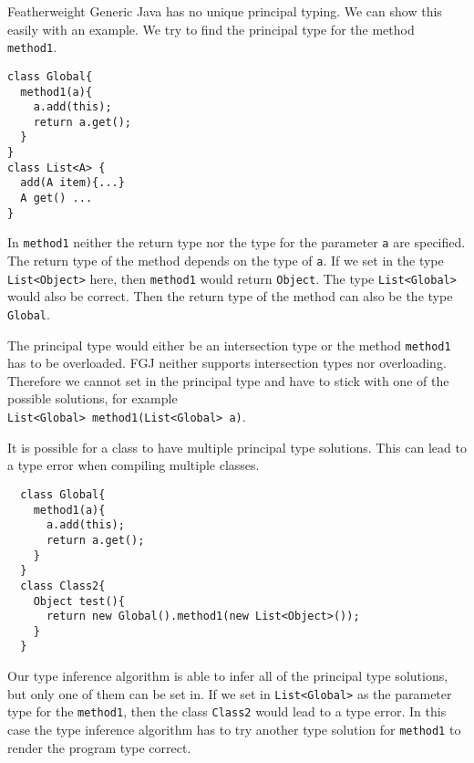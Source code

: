 Featherweight Generic Java has no unique principal typing.
We can show this easily with an example.
We try to find the principal type for the method \texttt{method1}.
\begin{lstlisting}
class Global{
  method1(a){
    a.add(this);
    return a.get();
  }
}
class List<A> {
  add(A item){...}
  A get() ...
}
\end{lstlisting}
In \texttt{method1} neither the return type nor the type for the parameter \texttt{a} are specified.
The return type of the method depends on the type of \texttt{a}.
If we set in the type \texttt{List<Object>} here, then \texttt{method1} would return \texttt{Object}.
The type \texttt{List<Global>} would also be correct.
Then the return type of the method can also be the type \texttt{Global}.

The principal type would either be an intersection type or the method \texttt{method1} has to be overloaded.
FGJ neither supports intersection types nor overloading.
Therefore we cannot set in the principal type and have to stick with one of the possible solutions,
for example\\
\texttt{List<Global> method1(List<Global> a)}.

It is possible for a class to have multiple principal type solutions.
This can lead to a type error when compiling multiple classes.
\begin{lstlisting}
  class Global{
    method1(a){
      a.add(this);
      return a.get();
    }
  }
  class Class2{
    Object test(){
      return new Global().method1(new List<Object>());
    }
  }
\end{lstlisting}
Our type inference algorithm is able to infer all of the principal type solutions, but only one of them can be set in.
If we set in \texttt{List<Global>} as the parameter type for the \texttt{method1},
then the class \texttt{Class2} would lead to a type error.
In this case the type inference algorithm has to try another type solution for \texttt{method1}
to render the program type correct.

\fi

